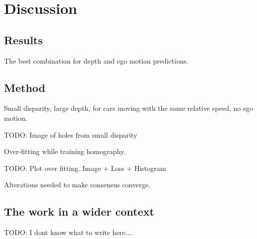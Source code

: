 \chapter{Discussion}\label{cha:discussion}

\section{Results}
The best combination for depth and ego motion predictions.

\section{Method}

Small disparity, large depth, for cars moving with the same relative speed, no ego motion.

TODO: Image of holes from small disparity

Over-fitting while training homography.

TODO: Plot over fitting. Image + Loss + Histogram

Alterations needed to make consensus converge.

\section{The work in a wider context}

TODO: I dont know what to write here....